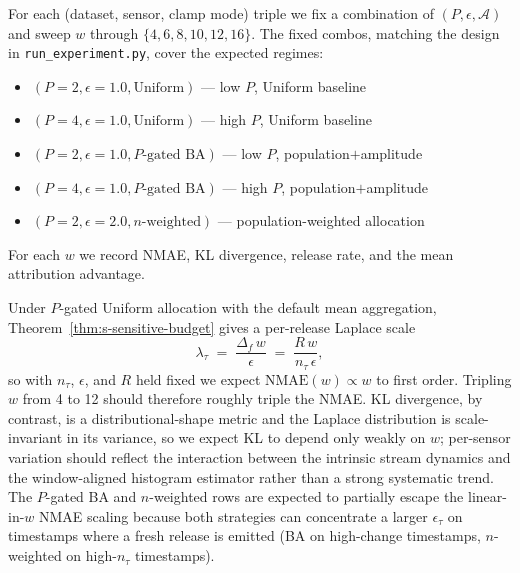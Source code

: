 For each (dataset, sensor, clamp mode) triple we fix a combination of $(P, \epsilon, \mathcal{A})$ and sweep $w$ through $\{4, 6, 8, 10, 12, 16\}$. The fixed combos, matching the design in \texttt{run\_experiment.py}, cover the expected regimes:

\begin{itemize}
\item $(P=2, \epsilon=1.0, \mathrm{Uniform})$ \hfill --- low $P$, Uniform baseline
\item $(P=4, \epsilon=1.0, \mathrm{Uniform})$ \hfill --- high $P$, Uniform baseline
\item $(P=2, \epsilon=1.0, P\text{-gated BA})$ \hfill --- low $P$, population$+$amplitude
\item $(P=4, \epsilon=1.0, P\text{-gated BA})$ \hfill --- high $P$, population$+$amplitude
\item $(P=2, \epsilon=2.0, n\text{-weighted})$ \hfill --- population-weighted allocation
\end{itemize}

For each $w$ we record NMAE, KL divergence, release rate, and the mean attribution advantage.


Under $P$-gated Uniform allocation with the default mean aggregation, Theorem~\ref{thm:s-sensitive-budget} gives a per-release Laplace scale
\[
  \lambda_\tau \;=\; \frac{\Delta_f\,w}{\epsilon} \;=\; \frac{R\,w}{n_\tau\,\epsilon},
\]
so with $n_\tau$, $\epsilon$, and $R$ held fixed we expect $\mathrm{NMAE}(w) \propto w$ to first order. Tripling $w$ from 4 to 12 should therefore roughly triple the NMAE. KL divergence, by contrast, is a distributional-shape metric and the Laplace distribution is scale-invariant in its variance, so we expect KL to depend only weakly on $w$; per-sensor variation should reflect the interaction between the intrinsic stream dynamics and the window-aligned histogram estimator rather than a strong systematic trend. The $P$-gated BA and $n$-weighted rows are expected to partially escape the linear-in-$w$ NMAE scaling because both strategies can concentrate a larger $\epsilon_\tau$ on timestamps where a fresh release is emitted (BA on high-change timestamps, $n$-weighted on high-$n_\tau$ timestamps).

